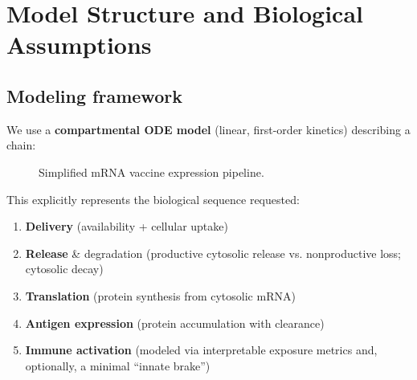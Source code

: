 \section{Model Structure and Biological Assumptions}

\subsection*{Modeling framework}

We use a \textbf{compartmental ODE  model} (linear, first-order kinetics) describing a chain:

\begin{figure}[htbp]
    \centering
    \caption{Simplified mRNA vaccine expression pipeline.}
\end{figure}

This explicitly represents the biological sequence requested:
\begin{enumerate}[label=\arabic*.]
    \item \textbf{Delivery} (availability + cellular uptake)
    \item \textbf{Release} \& degradation (productive cytosolic release vs. nonproductive loss; cytosolic decay)
    \item \textbf{Translation} (protein synthesis from cytosolic mRNA)
    \item \textbf{Antigen expression} (protein accumulation with clearance)
    \item \textbf{Immune activation} (modeled via interpretable exposure metrics and, optionally, a minimal ``innate brake'')
\end{enumerate}

